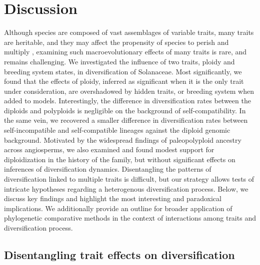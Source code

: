 \section{Discussion}

%
Although species are composed of vast assemblages of variable traits, many traits are heritable, and they may affect the propensity of species to perish and multiply \citep{lewontin_1970}, examining such macroevolutionary effects of many traits is rare, and remains challenging.
We investigated the influence of two traits, ploidy and breeding system states, in diversification of Solanaceae.
Most significantly, we found that the effects of ploidy, inferred as significant when it is the only trait under consideration, are overshadowed by hidden traits, or breeding system when added to models.  %
Interestingly, the difference in diversification rates between the diploids and polyploids is negligible on the background of self-compatibility.
In the same vein, we recovered a smaller difference in diversification rates between self-incompatible and self-compatible lineages against the diploid genomic background.
Motivated by the widespread findings of paleopolyploid ancestry across angiosperms, we also examined and found modest support for diploidization in the history of the family, but without significant effects on inferences of diversification dynamics. %
Disentangling the patterns of diversification linked to multiple traits is difficult, but our strategy allows tests of intricate hypotheses regarding a heterogenous diversification process.
Below, we discuss key findings and highlight the most interesting and paradoxical implications.
We additionally provide an outline for broader application of phylogenetic comparative methods in the context of interactions among traits and diversification process.

\subsection*{Disentangling trait effects on diversification} %

